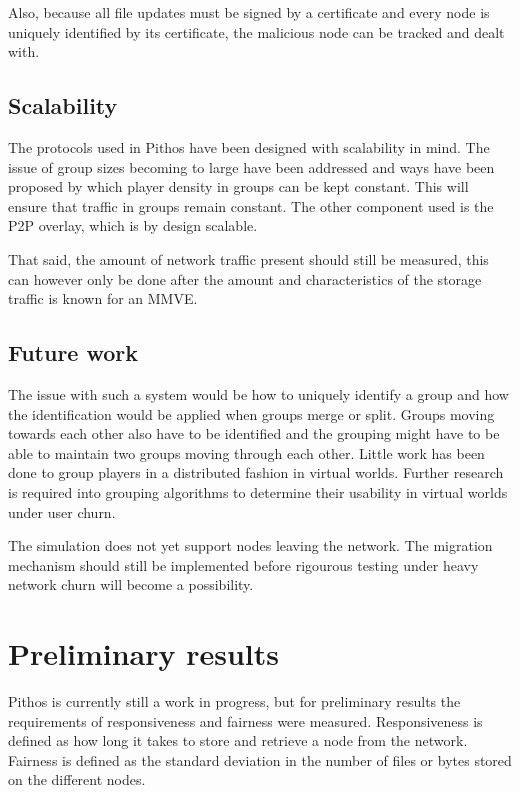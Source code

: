 \documentclass[10pt,a4paper,conference]{IEEEtran}
\begin{document}
Also, because all file updates must be signed by a certificate and every node is uniquely identified by its certificate, the malicious node can be
tracked and dealt with.

\subsection{Scalability}

The protocols used in Pithos have been designed with scalability in mind. The issue of group sizes becoming to large have been addressed and ways
have been proposed by which player density in groups can be kept constant. This will ensure that traffic in groups remain constant. The other
component used is the P2P overlay, which is by design scalable.

That said, the amount of network traffic present should still be measured, this can however only be done after the amount and characteristics of the
storage traffic is known for an MMVE.

\subsection{Future work}

The issue with such a system would be how to uniquely identify a group and how the identification would be applied when groups merge or split. Groups
moving towards each other also have to be identified and the grouping might have to be able to maintain two groups moving through each other. Little
work has been done to group players in a distributed fashion in virtual worlds. Further research is required into grouping algorithms to determine
their usability in virtual worlds under user churn.

The simulation does not yet support nodes leaving the network. The migration mechanism should still be implemented before rigourous testing under
heavy network churn will become a possibility.



\section{Preliminary results}
\label{results}

Pithos is currently still a work in progress, but for preliminary results the requirements of responsiveness and fairness were measured.
Responsiveness is defined as how long it takes to store and retrieve a node from the network. Fairness is defined as the standard deviation in the
number of files or bytes stored on the different nodes.
\end{document}
